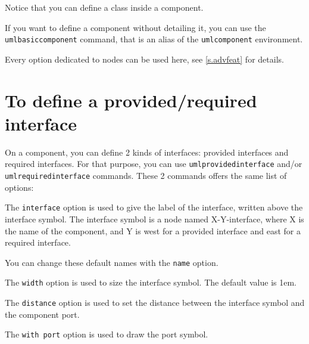 \documentclass[a4paper,11pt]{report}
\begin{document}
\medskip

Notice that you can define a class inside a component.

\medskip

If you want to define a component without detailing it, you can use the {\tt umlbasiccomponent} command, that is an alias of the {\tt umlcomponent} environment.

\medskip

Every \TikZ{} option dedicated to nodes can be used here, see \autoref{s.advfeat} for details.

\section{To define a provided/required interface}

On a component, you can define 2 kinds of interfaces: provided interfaces and required interfaces. For that purpose, you can use {\tt umlprovidedinterface} and/or {\tt umlrequiredinterface} commands.
These 2 commands offers the same list of options:

\medskip

\begin{minipage}{0.45\textwidth}

\end{minipage}
\begin{minipage}{0.55\textwidth}
\begin{center}
\end{center}
\end{minipage}

\medskip

The {\tt interface} option is used to give the label of the interface, written above the interface symbol.
The interface symbol is a node named X-Y-interface, where X is the name of the component, and Y is west for a provided interface and east for a required interface.

You can change these default names with the {\tt name} option.

\medskip

The {\tt width} option is used to size the interface symbol. The default value is 1em.

\medskip

The {\tt distance} option is used to set the distance between the interface symbol and the component port. 

\medskip

The {\tt with port} option is used to draw the port symbol.
\end{document}
